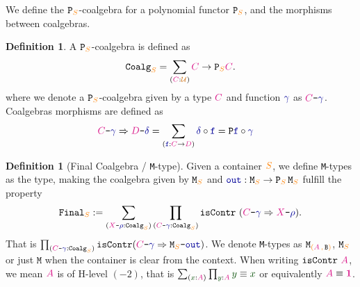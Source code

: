\documentclass[twoside,11pt,openright]{report}
\theoremstyle{plain} %
\theoremstyle{definition}
\newtheorem{defn}[thm]{Definition}%
\theoremstyle{remark}
\newcommand*{\term}[1]{\textcolor{green!30!black}{#1}} %
\newcommand*{\type}[1]{\textcolor{magenta!90!black}{#1}}
\newcommand*{\container}[1]{\textcolor{orange}{#1}}
\newcommand*{\containerpair}[2]{\ensuremath{\colorlet{savedleftcolor}{.}\color{orange}\left(\color{savedleftcolor}#1\,\textcolor{orange}{\mathbf{,}}\,#2\color{orange}\right)\color{savedleftcolor}}}
\newcommand*{\universe}[1]{\textcolor{orange!80!black}{#1}}
\newcommand*{\unit}{\type{\textbf{1}}}
\newcommand*{\coalg}[2]{#1\texttt{-}#2}
\newcommand*{\function}[1]{\textcolor{blue!60!black}{\ensuremath{\mathtt{#1}}}}
\newcommand*{\typeformer}[1]{\ensuremath{\mathtt{#1}}}
\newcommand*{\functor}[1]{\ensuremath{\mathbf{\mathtt{#1}}}}
\begin{document}
\noindent We define the \(\functor{P}_{\container{S}}\)-coalgebra for a polynomial functor \(\functor{P}_{\container{S}}\), and the morphisms between coalgebras.
\begin{defn}
  A \(\functor{P}_{\container{S}}\)-coalgebra is defined as
  \begin{equation}
    \typeformer{Coalg}_{\container{S}} = \sum_{(\type{C} : \universe{\mathcal{U}})} \type{C} \rightarrow \functor{P}_{\container{S}}\type{C}.
  \end{equation}
  where we denote a \(\functor{P}_{\container{S}}\)-coalgebra given by a type \(\type{C}\) and function \(\function{\gamma}\) as \(\coalg{\type{C}}{\function{\gamma}}\). Coalgebras morphisms are defined as
  \begin{equation}
    \begin{aligned}
      \coalg{\type{C}}{\function{\gamma}} \Rightarrow \coalg{\type{D}}{\function{\delta}} &= \sum_{(\function{f} : \type{C} \rightarrow \type{D})} \function{\delta} \circ \function{f} = \functor{P} \function{f} \circ \function{\gamma}
    \end{aligned}
  \end{equation}
\end{defn}
\begin{defn}[Final Coalgebra / \texttt{M}-type]
  \label{defn:M-type-final-def}
  Given a container \(\container{S}\), we define \texttt{M}-types as the type, making the coalgebra given by \(\typeformer{M}_{\container{S}}\) and \(\function{out} : \typeformer{M}_{\container{S}} \rightarrow \functor{P}_{\container{S}}\,\typeformer{M}_{\container{S}}\) fulfill the property
  \begin{equation}
    \typeformer{Final}_{\container{S}} := \sum_{(\coalg{\type{X}}{\function{\rho}} : \mathtt{Coalg}_{\container{S}})} \prod_{(\coalg{\type{C}}{\function{\gamma}} : \mathtt{Coalg}_{\container{S}})} \mathtt{isContr}~(\coalg{\type{C}}{\function{\gamma}} \Rightarrow \coalg{\type{X}}{\function{\rho}}).
  \end{equation}
  That is \(\prod_{(\coalg{\type{C}}{\function{\gamma}} : \mathtt{Coalg}_{\container{S}})} \mathtt{isContr}(\coalg{\type{C}}{\function{\gamma}} \Rightarrow \coalg{\typeformer{M}_{\container{S}}}{\function{out}})\). We denote \texttt{M}-types as \(\typeformer{M}_{\containerpair{\type{A}}{\typeformer{B}}}\), \(\typeformer{M}_{\container{S}}\) or just \(\typeformer{M}\) when the container is clear from the context. When writing \(\mathtt{isContr}~\type{A}\), we mean \(\type{A}\) is of H-level \((-2)\), that is \(\sum_{(\term{x} : \type{A})} \prod_{\term{y} : \type{A}} \term{y} \equiv \term{x}\) or equivalently \(\type{A} \equiv \unit\).
\end{defn}
\end{document}
